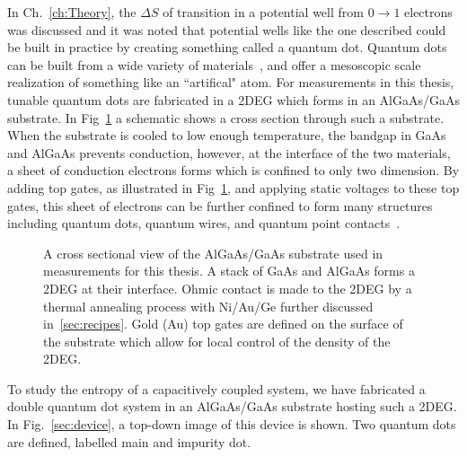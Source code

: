 In Ch.~\ref{ch:Theory}, the $\Delta S$ of transition in a potential well from $0 \to 1$ electrons was discussed and it was noted that potential wells like the one described could be built in practice by creating something called a quantum dot. Quantum dots can be built from a wide variety of materials~\cite{bera2010quantum}, and offer a mesoscopic scale realization of something like an ``artifical" atom. For measurements in this thesis, tunable quantum dots are fabricated in a \ac{2DEG} which forms in an AlGaAs/GaAs substrate. In Fig~\ref{fig:qd1} a schematic shows a cross section through such a substrate. When the substrate is cooled to low enough temperature, the bandgap in GaAs and AlGaAs prevents conduction, however, at the interface of the two materials, a sheet of conduction electrons forms which is confined to only two dimension. By adding top gates, as illustrated in Fig~\ref{fig:qd1}, and applying static voltages to these top gates, this sheet of electrons can be further confined to form many structures including quantum dots, quantum wires, and quantum point contacts~\cite{manfra2014molecular}. 
\begin{figure}[h]
\centering
{}
\caption{A cross sectional view of the AlGaAs/GaAs substrate used in measurements for this thesis. A stack of GaAs and AlGaAs forms a \ac{2DEG} at their interface. Ohmic contact is made to the \ac{2DEG} by a thermal annealing process with Ni/Au/Ge further discussed in~\ref{sec:recipes}. Gold (Au) top gates are defined on the surface of the substrate which allow for local control of the density of the \ac{2DEG}.}
\label{fig:qd1}       %
\end{figure}

To study the entropy of a capacitively coupled system, we have fabricated a double quantum dot system in an AlGaAs/GaAs substrate hosting such a \ac{2DEG}. In Fig.~\ref{sec:device}, a top-down image of this device is shown. Two quantum dots are defined, labelled main and impurity dot. 


